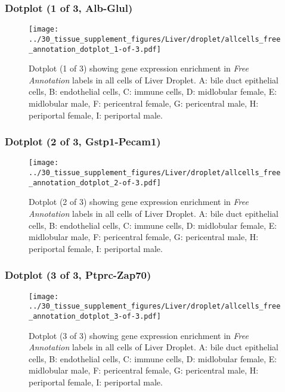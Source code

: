 \clearpage

\subsubsection{Dotplot (1 of 3, Alb-Glul)}
\begin{figure}[h]
\centering
\texttt{[image: ../30\_tissue\_supplement\_figures/Liver/droplet/allcells\_free\_annotation\_dotplot\_1-of-3.pdf]}

\caption{ Dotplot (1 of 3)  showing gene expression enrichment in \emph{Free Annotation} labels in all cells of Liver Droplet. A: bile duct epithelial cells, B: endothelial cells, C: immune cells, D: midlobular female, E: midlobular male, F: pericentral female, G: pericentral male, H: periportal female, I: periportal male.}
\end{figure}


\clearpage

\subsubsection{Dotplot (2 of 3, Gstp1-Pecam1)}
\begin{figure}[h]
\centering
\texttt{[image: ../30\_tissue\_supplement\_figures/Liver/droplet/allcells\_free\_annotation\_dotplot\_2-of-3.pdf]}

\caption{ Dotplot (2 of 3)  showing gene expression enrichment in \emph{Free Annotation} labels in all cells of Liver Droplet. A: bile duct epithelial cells, B: endothelial cells, C: immune cells, D: midlobular female, E: midlobular male, F: pericentral female, G: pericentral male, H: periportal female, I: periportal male.}
\end{figure}


\clearpage

\subsubsection{Dotplot (3 of 3, Ptprc-Zap70)}
\begin{figure}[h]
\centering
\texttt{[image: ../30\_tissue\_supplement\_figures/Liver/droplet/allcells\_free\_annotation\_dotplot\_3-of-3.pdf]}

\caption{ Dotplot (3 of 3)  showing gene expression enrichment in \emph{Free Annotation} labels in all cells of Liver Droplet. A: bile duct epithelial cells, B: endothelial cells, C: immune cells, D: midlobular female, E: midlobular male, F: pericentral female, G: pericentral male, H: periportal female, I: periportal male.}
\end{figure}


